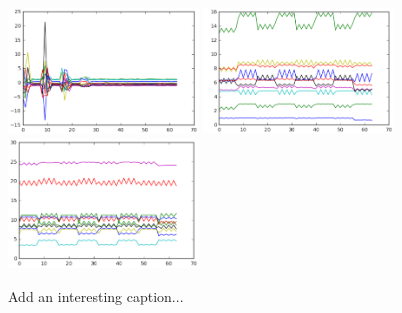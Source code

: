 				\begin{figure}[h]
					\centering
					\includegraphics[width=0.45\textwidth]{images/multiPosGraphConvFC}
					\includegraphics[width=0.45\textwidth]{images/multiPosGraphConvCAM}
					\includegraphics[width=0.45\textwidth]{images/multiPosGraphConvCAM2}
					\caption{Add an interesting caption...}
					\label{fig:multipose_graph_1}
				\end{figure}

			





